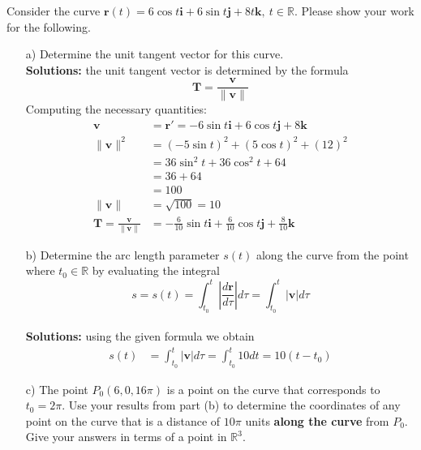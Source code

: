 \ifnum {}
    \question[6] Consider the curve $\mathbf r(t) = 6\cos t \mathbf i + 6 \sin t \mathbf j + 8t\mathbf k, \ t \in \mathbb R$. Please show your work for the following. 
    \begin{enumerate}
        \item[a)] Determine the unit tangent vector for this curve. 
            \ifnum {} {\color{DarkBlue} \\[12pt] 
            \textbf{Solutions:} the unit tangent vector is determined by the formula
            $$\mathbf T = \frac{\mathbf v}{\| \mathbf v \|}$$
            Computing the necessary quantities:
            \begin{align}
                \mathbf v &= \mathbf r '  = -6\sin t \mathbf i + 6 \cos t \mathbf j + 8\mathbf k\\
                \|\mathbf v \|^2 &= (-5\sin t)^2 + (5 \cos t)^2 + (12)^2 \\ 
                &= 36\sin^2t + 36\cos^2t + 64 \\
                &= 36+64 \\
                &= 100 \\
                \|\mathbf v \| &= \sqrt{100} = 10 \\
                \mathbf T = \frac{\mathbf v}{\| \mathbf v \|} & = -\frac{6}{10}\sin t \mathbf i + \frac{6}{10} \cos t \mathbf j + \frac{8}{10}\mathbf k
            \end{align}
            } 
            \else 
            \vspace{7cm}
            \fi        
        \item[b)] Determine the arc length parameter $s(t)$ along the curve from the point where $t_0 \in \mathbb R$ by evaluating the integral $$s = s(t) = \int_{t_0}^{t} \left | \frac{d\mathbf r}{d \tau} \right | d \tau 
        = \int_{t_0}^{t} \left | \mathbf v \right | d \tau$$
        \ifnum {} {\color{DarkBlue} \\[12pt] 
        \textbf{Solutions:} using the given formula we obtain
            \begin{align}
                s(t) &= \int_{t_0}^{t} \left | \mathbf v \right | d\tau 
                = \int_{t_0}^{t}   10  dt 
                = 10 (t - t_0) 
            \end{align}
        } 
        \else 
        \vspace{3cm}
        \fi        
        \item[c)] The point $P_0(6,0,16\pi)$ is a point on the curve that corresponds to $t_0=2\pi$. Use your results from part (b) to determine the coordinates of any point on the curve that is a distance of $10\pi$ units \textbf{along the curve} from $P_0$. Give your answers in terms of a point in $\mathbb R^3$. 

\end{enumerate}
